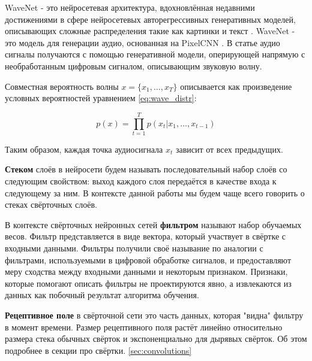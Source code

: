 \documentclass[../diploma.tex]{subfiles}
\begin{document}
WaveNet - это нейросетевая архитектура, вдохновлённая недавними достижениями в сфере нейросетевых авторегрессивных генеративных моделей, описывающих сложные распределения такие как картинки \cite{article:oord2016pixel} и текст \cite{article:jozefowicz2016exploring}. WaveNet - это модель для генерации аудио, основанная на PixelCNN \cite{article:oord2016conditional}.
В статье аудио сигналы получаются с помощью генеративной модели, оперирующей напрямую с необработанным цифровым сигналом, описывающим звуковую волну.

Совместная вероятность волны $x = \{ x_1, \dots, x_T \}$ описывается как произведение условных вероятностей уравнением \ref{eq:wave_distr}:

\begin{equation} \label{eq:wave_distr}
p(x) = \prod^{T}_{t=1}{} p(x_t|x_1, \dots, x_{t-1})
\end{equation}

Таким образом, каждая точка аудиосигнала $x_t$ зависит от всех предыдущих.

\begin{definition}
\textbf{Стеком} слоёв в нейросети будем называть последовательный набор слоёв со следующим свойством: выход каждого слоя передаётся в качестве входа к следующему за ним. В контексте данной работы мы будем чаще всего говорить о стеках свёрточных слоёв.
\end{definition}

\begin{definition}

В контексте свёрточных нейронных сетей \textbf{фильтром} называют набор обучаемых весов.
Фильтр представляется в виде вектора, который участвует в свёртке с входными данными.
Фильтры получили своё называние по аналогии с фильтрами, используемыми в цифровой обработке сигналов, и предоставляют меру сходства между входными данными и некоторым признаком.
Признаки, которые помогают описать фильтры не проектируются явно, а извлекаются из данных как побочный результат алгоритма обучения.
\end{definition}


\begin{definition}
\textbf{Рецептивное поле} в свёрточной сети это часть данных, которая "видна" фильтру в момент времени. Размер рецептивного поля растёт линейно относительно размера стека обычных свёрток и экспоненциально для дырявых свёрток. Об этом подробнее в секции про свёртки. \ref{sec:convolutions}
\end{definition}
\end{document}
